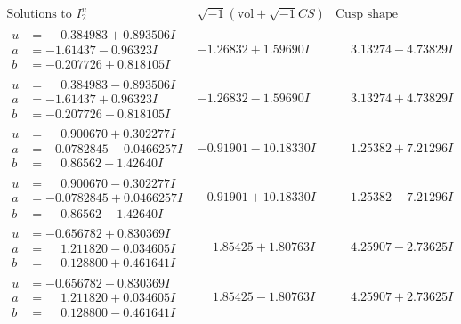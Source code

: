 \documentclass[1p]{elsarticle_modified}
\theoremstyle{definition}
\newcommand{\I}{\sqrt{-1}}
\begin{document}
$$\begin{array}{c|c|c}  
\text{Solutions to }I^u_{2}& \I (\text{vol} + \sqrt{-1}CS) & \text{Cusp shape}\\
 \hline 
\begin{aligned}
u &= \phantom{-}0.384983 + 0.893506 I \\
a &= -1.61437 - 0.96323 I \\
b &= -0.207726 + 0.818105 I\end{aligned}
 & -1.26832 + 1.59690 I & \phantom{-}3.13274 - 4.73829 I \\ \hline\begin{aligned}
u &= \phantom{-}0.384983 - 0.893506 I \\
a &= -1.61437 + 0.96323 I \\
b &= -0.207726 - 0.818105 I\end{aligned}
 & -1.26832 - 1.59690 I & \phantom{-}3.13274 + 4.73829 I \\ \hline\begin{aligned}
u &= \phantom{-}0.900670 + 0.302277 I \\
a &= -0.0782845 - 0.0466257 I \\
b &= \phantom{-}0.86562 + 1.42640 I\end{aligned}
 & -0.91901 - 10.18330 I & \phantom{-}1.25382 + 7.21296 I \\ \hline\begin{aligned}
u &= \phantom{-}0.900670 - 0.302277 I \\
a &= -0.0782845 + 0.0466257 I \\
b &= \phantom{-}0.86562 - 1.42640 I\end{aligned}
 & -0.91901 + 10.18330 I & \phantom{-}1.25382 - 7.21296 I \\ \hline\begin{aligned}
u &= -0.656782 + 0.830369 I \\
a &= \phantom{-}1.211820 - 0.034605 I \\
b &= \phantom{-}0.128800 + 0.461641 I\end{aligned}
 & \phantom{-}1.85425 + 1.80763 I & \phantom{-}4.25907 - 2.73625 I \\ \hline\begin{aligned}
u &= -0.656782 - 0.830369 I \\
a &= \phantom{-}1.211820 + 0.034605 I \\
b &= \phantom{-}0.128800 - 0.461641 I\end{aligned}
 & \phantom{-}1.85425 - 1.80763 I & \phantom{-}4.25907 + 2.73625 I \\ \hline\begin{aligned}

\end{aligned}
\end{array}$$
\end{document}
